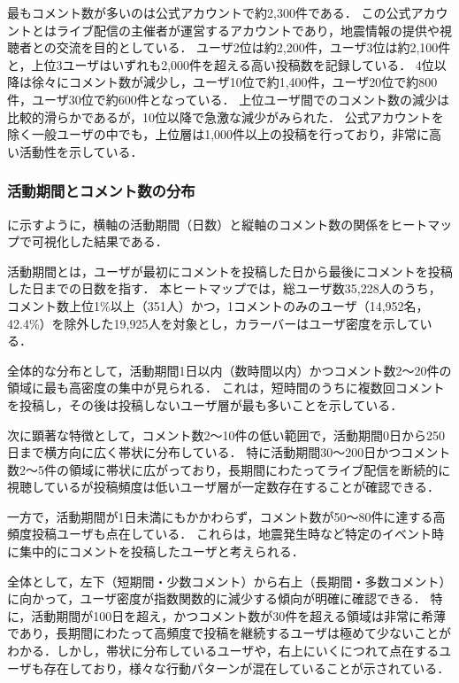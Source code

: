 

最もコメント数が多いのは公式アカウントで約2,300件である．
この公式アカウントとはライブ配信の主催者が運営するアカウントであり，地震情報の提供や視聴者との交流を目的としている．
ユーザ2位は約2,200件，ユーザ3位は約2,100件と，上位3ユーザはいずれも2,000件を超える高い投稿数を記録している．
4位以降は徐々にコメント数が減少し，ユーザ10位で約1,400件，ユーザ20位で約800件，ユーザ30位で約600件となっている．
上位ユーザ間でのコメント数の減少は比較的滑らかであるが，10位以降で急激な減少がみられた．
公式アカウントを除く一般ユーザの中でも，上位層は1,000件以上の投稿を行っており，非常に高い活動性を示している．

\subsubsection{活動期間とコメント数の分布}
に示すように，横軸の活動期間（日数）と縦軸のコメント数の関係をヒートマップで可視化した結果である．



活動期間とは，ユーザが最初にコメントを投稿した日から最後にコメントを投稿した日までの日数を指す．
本ヒートマップでは，総ユーザ数35,228人のうち，コメント数上位1\%以上（351人）かつ，1コメントのみのユーザ（14,952名，42.4\%）を除外した19,925人を対象とし，カラーバーはユーザ密度を示している．

全体的な分布として，活動期間1日以内（数時間以内）かつコメント数2〜20件の領域に最も高密度の集中が見られる．
これは，短時間のうちに複数回コメントを投稿し，その後は投稿しないユーザ層が最も多いことを示している．

次に顕著な特徴として，コメント数2〜10件の低い範囲で，活動期間0日から250日まで横方向に広く帯状に分布している．
特に活動期間30〜200日かつコメント数2〜5件の領域に帯状に広がっており，長期間にわたってライブ配信を断続的に視聴しているが投稿頻度は低いユーザ層が一定数存在することが確認できる．

一方で，活動期間が1日未満にもかかわらず，コメント数が50〜80件に達する高頻度投稿ユーザも点在している．
これらは，地震発生時など特定のイベント時に集中的にコメントを投稿したユーザと考えられる．

全体として，左下（短期間・少数コメント）から右上（長期間・多数コメント）に向かって，ユーザ密度が指数関数的に減少する傾向が明確に確認できる．
特に，活動期間が100日を超え，かつコメント数が30件を超える領域は非常に希薄であり，長期間にわたって高頻度で投稿を継続するユーザは極めて少ないことがわかる．しかし，帯状に分布しているユーザや，右上にいくにつれて点在するユーザも存在しており，様々な行動パターンが混在していることが示されている．

